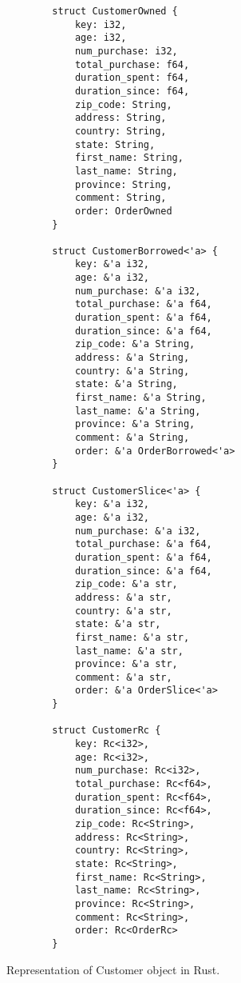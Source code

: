 \begin{figure}[htb]
    \begin{lstlisting}
        struct CustomerOwned {
            key: i32,
            age: i32,
            num_purchase: i32,
            total_purchase: f64,
            duration_spent: f64, 
            duration_since: f64,
            zip_code: String,
            address: String,
            country: String,
            state: String,
            first_name: String,
            last_name: String,
            province: String,
            comment: String, 
            order: OrderOwned
        }

        struct CustomerBorrowed<'a> {
            key: &'a i32,
            age: &'a i32,
            num_purchase: &'a i32,
            total_purchase: &'a f64,
            duration_spent: &'a f64, 
            duration_since: &'a f64,
            zip_code: &'a String,
            address: &'a String,
            country: &'a String,
            state: &'a String,
            first_name: &'a String,
            last_name: &'a String,
            province: &'a String,
            comment: &'a String, 
            order: &'a OrderBorrowed<'a>
        }

        struct CustomerSlice<'a> {
            key: &'a i32,
            age: &'a i32,
            num_purchase: &'a i32,
            total_purchase: &'a f64,
            duration_spent: &'a f64, 
            duration_since: &'a f64,
            zip_code: &'a str,
            address: &'a str,
            country: &'a str, 
            state: &'a str,
            first_name: &'a str,
            last_name: &'a str,
            province: &'a str,
            comment: &'a str,
            order: &'a OrderSlice<'a>
        }

        struct CustomerRc {
            key: Rc<i32>,
            age: Rc<i32>,
            num_purchase: Rc<i32>,
            total_purchase: Rc<f64>,
            duration_spent: Rc<f64>, 
            duration_since: Rc<f64>,
            zip_code: Rc<String>,
            address: Rc<String>,
            country: Rc<String>,
            state: Rc<String>,
            first_name: Rc<String>,
            last_name: Rc<String>,
            province: Rc<String>,
            comment: Rc<String>, 
            order: Rc<OrderRc>
        }
    \end{lstlisting}
    \caption{Representation of Customer object in Rust.}
    \label{fig:Sampling}
\end{figure}

\clearpage



